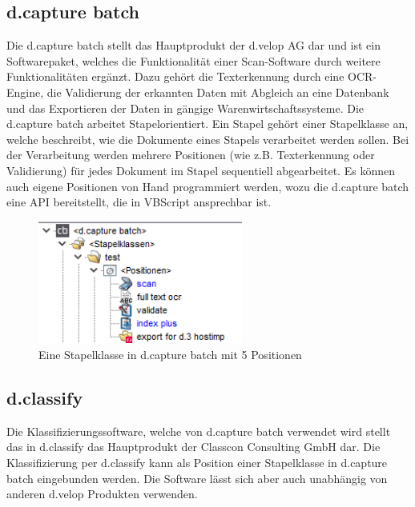 \documentclass{whswinvcbook}
\begin{document}
\subsection{d.capture batch}
Die d.capture batch stellt das Hauptprodukt der d.velop AG dar und ist ein Softwarepaket, welches die Funktionalität einer Scan-Software durch weitere Funktionalitäten ergänzt. Dazu gehört die Texterkennung durch eine OCR-Engine, die Validierung der erkannten Daten mit Abgleich an eine Datenbank und das Exportieren der Daten in gängige Warenwirtschaftssysteme. Die d.capture batch arbeitet Stapelorientiert. Ein Stapel gehört einer Stapelklasse an, welche beschreibt, wie die Dokumente eines Stapels verarbeitet werden sollen. Bei der Verarbeitung werden mehrere Positionen (wie z.B. Texterkennung oder Validierung) für jedes Dokument im Stapel sequentiell abgearbeitet. Es können auch eigene Positionen von Hand programmiert werden, wozu die d.capture batch eine API bereitstellt, die in VBScript ansprechbar ist.
\begin{figure}[h]
    \centering
    \includegraphics[width=0.60\textwidth]{img/dcapture_positionen.png}
    \caption{Eine Stapelklasse in d.capture batch mit 5 Positionen}
    \label{fig-dcapture-positionen}
\end{figure}
\subsection{d.classify}
Die Klassifizierungssoftware, welche von d.capture batch verwendet wird stellt das in d.classify das Hauptprodukt der Classcon Consulting GmbH dar. Die Klassifizierung per d.classify kann als Position einer Stapelklasse in d.capture batch eingebunden werden. Die Software lässt sich aber auch unabhängig von anderen d.velop Produkten verwenden.
\end{document}
